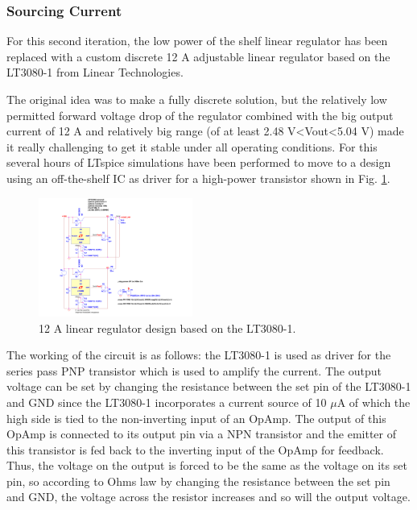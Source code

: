 \subsubsection{Sourcing Current}
For this second iteration, the low power of the shelf linear regulator has been replaced with a custom discrete 12 A adjustable linear regulator based on the LT3080-1 from Linear Technologies.

The original idea was to make a fully discrete solution, but the relatively low permitted forward voltage drop of the regulator combined with the big output current of 12 A and relatively big range (of at least 2.48 V\textless Vout\textless 5.04 V) made it really challenging to get it stable under all operating conditions. For this several hours of LTspice simulations have been performed to move to a design using an off-the-shelf IC as driver for a high-power transistor shown in Fig. \ref{fig:LT3080-1_LinRegSchematic}.

\begin{figure}[h!]
    \centering
    \includegraphics[width=0.45\textwidth]{LT3080-1_LinRegSchematic.pdf}
    \caption{12 A linear regulator design based on the LT3080-1.}
    \label{fig:LT3080-1_LinRegSchematic}
\end{figure}

The working of the circuit is as follows: the LT3080-1 is used as driver for the series pass PNP transistor which is used to amplify the current.
The output voltage can be set by changing the resistance between the set pin of the LT3080-1 and GND since the LT3080-1 incorporates a current source of 10 $\mu$A of which the high side is tied to the non-inverting input of an OpAmp. The output of this OpAmp is connected to its output pin via a NPN transistor and the emitter of this transistor is fed back to the inverting input of the OpAmp for feedback. Thus, the voltage on the output is forced to be the same as the voltage on its set pin, so according to Ohms law by changing the resistance between the set pin and GND, the voltage across the resistor increases and so will the output voltage.

